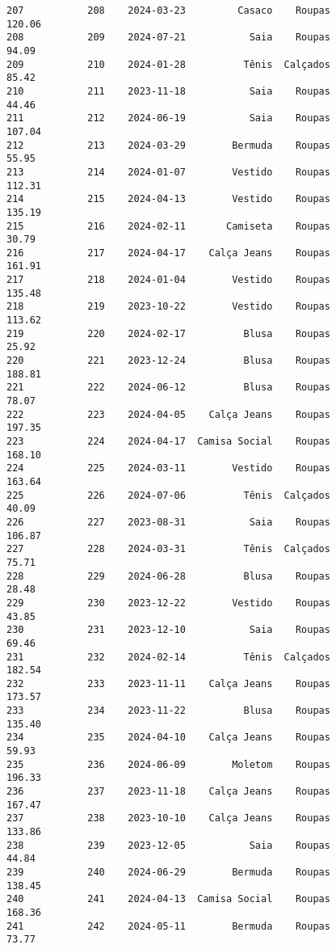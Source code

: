\documentclass[11pt]{article}
\begin{document}
\begin{Verbatim}[commandchars=\\\{\}]
207           208    2024-03-23         Casaco    Roupas          120.06   
208           209    2024-07-21           Saia    Roupas           94.09   
209           210    2024-01-28          Tênis  Calçados           85.42   
210           211    2023-11-18           Saia    Roupas           44.46   
211           212    2024-06-19           Saia    Roupas          107.04   
212           213    2024-03-29        Bermuda    Roupas           55.95   
213           214    2024-01-07        Vestido    Roupas          112.31   
214           215    2024-04-13        Vestido    Roupas          135.19   
215           216    2024-02-11       Camiseta    Roupas           30.79   
216           217    2024-04-17    Calça Jeans    Roupas          161.91   
217           218    2024-01-04        Vestido    Roupas          135.48   
218           219    2023-10-22        Vestido    Roupas          113.62   
219           220    2024-02-17          Blusa    Roupas           25.92   
220           221    2023-12-24          Blusa    Roupas          188.81   
221           222    2024-06-12          Blusa    Roupas           78.07   
222           223    2024-04-05    Calça Jeans    Roupas          197.35   
223           224    2024-04-17  Camisa Social    Roupas          168.10   
224           225    2024-03-11        Vestido    Roupas          163.64   
225           226    2024-07-06          Tênis  Calçados           40.09   
226           227    2023-08-31           Saia    Roupas          106.87   
227           228    2024-03-31          Tênis  Calçados           75.71   
228           229    2024-06-28          Blusa    Roupas           28.48   
229           230    2023-12-22        Vestido    Roupas           43.85   
230           231    2023-12-10           Saia    Roupas           69.46   
231           232    2024-02-14          Tênis  Calçados          182.54   
232           233    2023-11-11    Calça Jeans    Roupas          173.57   
233           234    2023-11-22          Blusa    Roupas          135.40   
234           235    2024-04-10    Calça Jeans    Roupas           59.93   
235           236    2024-06-09        Moletom    Roupas          196.33   
236           237    2023-11-18    Calça Jeans    Roupas          167.47   
237           238    2023-10-10    Calça Jeans    Roupas          133.86   
238           239    2023-12-05           Saia    Roupas           44.84   
239           240    2024-06-29        Bermuda    Roupas          138.45   
240           241    2024-04-13  Camisa Social    Roupas          168.36   
241           242    2024-05-11        Bermuda    Roupas           73.77   

\end{Verbatim}
\end{document}
